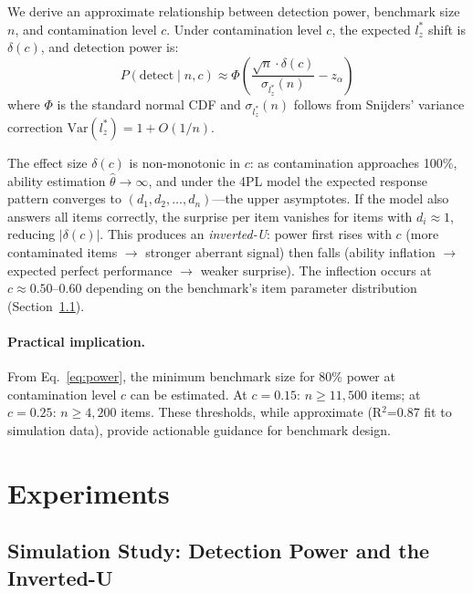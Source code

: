 \documentclass[11pt,a4paper]{article}
\begin{document}
We derive an approximate relationship between detection power, benchmark size $n$, and contamination level $c$. Under contamination level $c$, the expected $l_z^*$ shift is $\delta(c)$, and detection power is:
\begin{equation}
P(\text{detect} \mid n, c) \approx \Phi\!\left(\frac{\sqrt{n} \cdot \delta(c)}{\sigma_{l_z^*}(n)} - z_\alpha \right)
\label{eq:power}
\end{equation}
where $\Phi$ is the standard normal CDF and $\sigma_{l_z^*}(n)$ follows from Snijders' variance correction $\text{Var}(l_z^*) = 1 + O(1/n)$.

The effect size $\delta(c)$ is non-monotonic in $c$: as contamination approaches 100\%, ability estimation $\hat{\theta} \to \infty$, and under the 4PL model the expected response pattern converges to $(d_1, d_2, \ldots, d_n)$---the upper asymptotes. If the model also answers all items correctly, the surprise per item vanishes for items with $d_i \approx 1$, reducing $|\delta(c)|$. This produces an \emph{inverted-U}: power first rises with $c$ (more contaminated items $\to$ stronger aberrant signal) then falls (ability inflation $\to$ expected perfect performance $\to$ weaker surprise). The inflection occurs at $c \approx 0.50$--0.60 depending on the benchmark's item parameter distribution (Section~\ref{sec:simulation}).

\paragraph{Practical implication.} From Eq.~\ref{eq:power}, the minimum benchmark size for 80\% power at contamination level $c$ can be estimated. At $c=0.15$: $n \geq 11{,}500$ items; at $c=0.25$: $n \geq 4{,}200$ items. These thresholds, while approximate (R$^2$=0.87 fit to simulation data), provide actionable guidance for benchmark design.

\section{Experiments}

\subsection{Simulation Study: Detection Power and the Inverted-U}
\label{sec:simulation}
\end{document}
